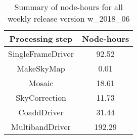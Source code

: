 \begin{table}[h]
  \centering
  \begin{tabular} {|c|c|}
    \hline
    Processing step & Node-hours \\
    \hline
    SingleFrameDriver &  92.52 \\ 
    MakeSkyMap        &   0.01 \\
    Mosaic            &  18.61 \\
    SkyCorrection     &  11.73 \\
    CoaddDriver       &  31.44 \\
    MultibandDriver   & 192.29 \\
    \hline
  \end{tabular}
  \caption{Summary of node-hours for all weekly release version w\_2018\_06}
  \label{tbl:PerTask06}
\end{table}
